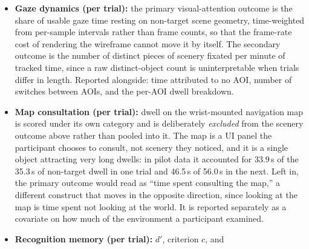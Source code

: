 \begin{itemize}
    Three properties govern how the ratio is read. The grid discretises the
    surface at 0.5\,m and connects cells in eight directions, so a diagonal
    run is measured up to roughly 8\% long; this bias is identical for every
    trial in a pool and therefore cancels in the between-condition comparison
    the ratio is used for. The denominator assumes the target positions are
    known in advance, which the participant's are not, since finding them is
    the task---so the ratio is always well above unity and is interpreted as a
    relative index compared across conditions within a pool, never as an
    absolute claim about how far a participant overshot. Finally, path length
    is measured in the ground plane so that numerator and denominator share a
    plane, and because the vertical component of a head-mounted sensor's
    trajectory accumulates gait rather than route choice; the same tours
    measured in three dimensions are within 0.5\% of their planar lengths,
    confirming that the routes are effectively flat.
  \item \textbf{Gaze dynamics (per trial):} the primary visual-attention
    outcome is the share of usable gaze time resting on non-target scene
    geometry, time-weighted from per-sample intervals rather than frame
    counts, so that the frame-rate cost of rendering the wireframe cannot move
    it by itself. The secondary outcome is the number of distinct pieces of
    scenery fixated per minute of tracked time, since a raw distinct-object
    count is uninterpretable when trials differ in length. Reported alongside:
    time attributed to no AOI, number of switches between AOIs, and the
    per-AOI dwell breakdown.
  \item \textbf{Map consultation (per trial):} dwell on the wrist-mounted
    navigation map is scored under its own category and is deliberately
    \emph{excluded} from the scenery outcome above rather than pooled into it.
    The map is a UI panel the participant chooses to consult, not scenery they
    noticed, and it is a single object attracting very long dwells: in pilot
    data it accounted for 33.9\,s of the 35.3\,s of non-target dwell in one
    trial and 46.5\,s of 56.0\,s in the next. Left in, the primary outcome
    would read as ``time spent consulting the map,'' a different construct
    that moves in the opposite direction, since looking at the map is time
    spent not looking at the world. It is reported separately as a covariate
    on how much of the environment a participant examined.
  \item \textbf{Recognition memory (per trial):} $d'$, criterion $c$, and

\end{itemize}
